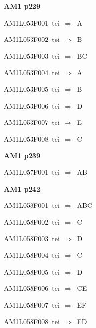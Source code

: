 \par\vfill\eject
{\bf\hfill AM1 p229\hfill\hbox{}}\par\bigskip
{\sixrm AM1L053F001\ {\sixit tei}\ }$\Rightarrow$\ A\par\smallskip
{\sixrm AM1L053F002\ {\sixit tei}\ }$\Rightarrow$\ B\par\smallskip
{\sixrm AM1L053F003\ {\sixit tei}\ }$\Rightarrow$\ BC\par\smallskip
{\sixrm AM1L053F004\ {\sixit tei}\ }$\Rightarrow$\ A\par\smallskip
{\sixrm AM1L053F005\ {\sixit tei}\ }$\Rightarrow$\ B\par\smallskip
{\sixrm AM1L053F006\ {\sixit tei}\ }$\Rightarrow$\ D\par\smallskip
{\sixrm AM1L053F007\ {\sixit tei}\ }$\Rightarrow$\ E\par\smallskip
{\sixrm AM1L053F008\ {\sixit tei}\ }$\Rightarrow$\ C\par\smallskip

\par\vfill\eject
{\bf\hfill AM1 p239\hfill\hbox{}}\par\bigskip
{\sixrm AM1L057F001\ {\sixit tei}\ }$\Rightarrow$\ AB\par\smallskip

\par\vfill\eject
{\bf\hfill AM1 p242\hfill\hbox{}}\par\bigskip
{\sixrm AM1L058F001\ {\sixit tei}\ }$\Rightarrow$\ ABC\par\smallskip
{\sixrm AM1L058F002\ {\sixit tei}\ }$\Rightarrow$\ C\par\smallskip
{\sixrm AM1L058F003\ {\sixit tei}\ }$\Rightarrow$\ D\par\smallskip
{\sixrm AM1L058F004\ {\sixit tei}\ }$\Rightarrow$\ C\par\smallskip
{\sixrm AM1L058F005\ {\sixit tei}\ }$\Rightarrow$\ D\par\smallskip
{\sixrm AM1L058F006\ {\sixit tei}\ }$\Rightarrow$\ CE\par\smallskip
{\sixrm AM1L058F007\ {\sixit tei}\ }$\Rightarrow$\ EF\par\smallskip
{\sixrm AM1L058F008\ {\sixit tei}\ }$\Rightarrow$\ FD\par\smallskip

